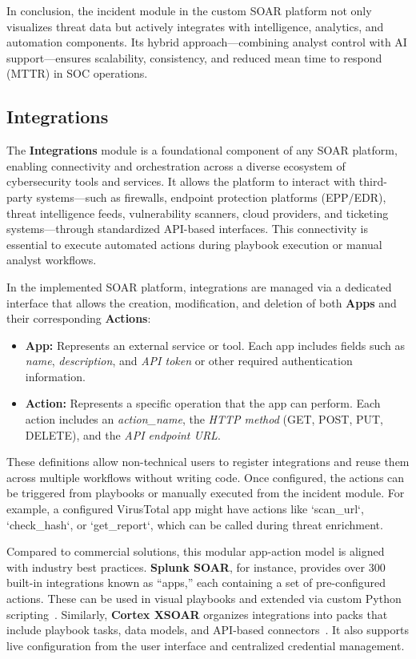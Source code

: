 In conclusion, the incident module in the custom SOAR platform not only visualizes threat data but actively integrates with intelligence, analytics, and automation components. Its hybrid approach—combining analyst control with AI support—ensures scalability, consistency, and reduced mean time to respond (MTTR) in SOC operations.

\subsection{Integrations}

The \textbf{Integrations} module is a foundational component of any SOAR platform, enabling connectivity and orchestration across a diverse ecosystem of cybersecurity tools and services. It allows the platform to interact with third-party systems—such as firewalls, endpoint protection platforms (EPP/EDR), threat intelligence feeds, vulnerability scanners, cloud providers, and ticketing systems—through standardized API-based interfaces. This connectivity is essential to execute automated actions during playbook execution or manual analyst workflows.

In the implemented SOAR platform, integrations are managed via a dedicated interface that allows the creation, modification, and deletion of both \textbf{Apps} and their corresponding \textbf{Actions}:

\begin{itemize}
    \item \textbf{App:} Represents an external service or tool. Each app includes fields such as \textit{name}, \textit{description}, and \textit{API token} or other required authentication information.
    \item \textbf{Action:} Represents a specific operation that the app can perform. Each action includes an \textit{action\_name}, the \textit{HTTP method} (GET, POST, PUT, DELETE), and the \textit{API endpoint URL}.
\end{itemize}

These definitions allow non-technical users to register integrations and reuse them across multiple workflows without writing code. Once configured, the actions can be triggered from playbooks or manually executed from the incident module. For example, a configured VirusTotal app might have actions like `scan\_url`, `check\_hash`, or `get\_report`, which can be called during threat enrichment.

Compared to commercial solutions, this modular app-action model is aligned with industry best practices. \textbf{Splunk SOAR}, for instance, provides over 300 built-in integrations known as “apps,” each containing a set of pre-configured actions. These can be used in visual playbooks and extended via custom Python scripting~\cite{splunk}. Similarly, \textbf{Cortex XSOAR} organizes integrations into packs that include playbook tasks, data models, and API-based connectors~\cite{paloalto}. It also supports live configuration from the user interface and centralized credential management.


